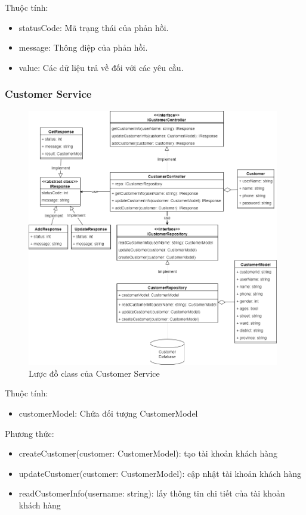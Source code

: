 Thuộc tính:
\begin{itemize}
	\item statusCode: Mã trạng thái của phản hồi.
	\item message: Thông điệp của phản hồi.
	\item value: Các dữ liệu trả về đối với các yêu cầu.
\end{itemize}

\newpage


\subsubsection{Customer Service}
\begin{figure}[!htp]
	\centering
	\includegraphics[width=11cm]{img/Architecture/service/CustomerService.png}
	\newline
	\caption{Lược đồ class của Customer Service}
\end{figure}

Thuộc tính:
\begin{itemize}
	\item customerModel: Chứa đối tượng CustomerModel
\end{itemize}
Phương thức:
\begin{itemize}
	\item createCustomer(customer: CustomerModel): tạo tài khoản khách hàng
	\item updateCustomer(customer: CustomerModel): cập nhật tài khoản khách hàng
	\item readCustomerInfo(username: string): lấy thông tin chi tiết của tài khoản khách hàng
\end{itemize}

